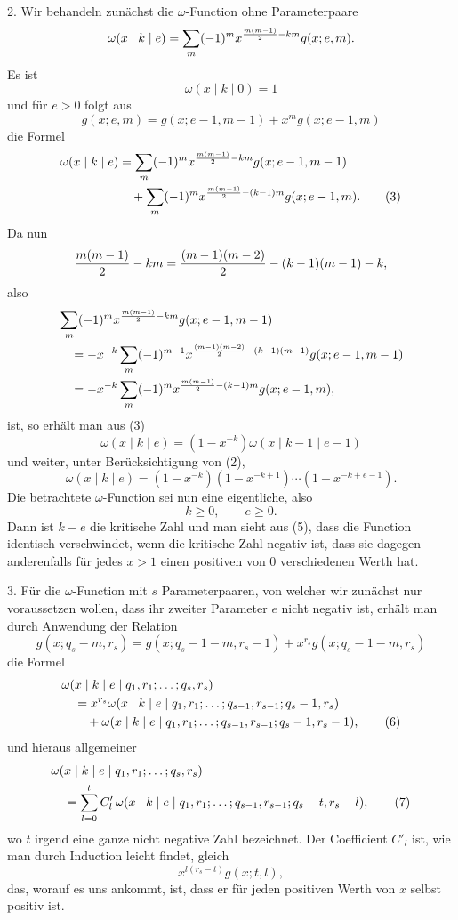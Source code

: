 2. Wir behandeln zunächst die $\omega$-Function ohne Parameterpaare
\[
 \omega(x\mid k\mid e)=\sum_m(-1)^m x^{{m(m-1)\over2}-km}g(x;e,m).
\]
Es ist
\begin{equation}
 \omega(x\mid k\mid0)=1
\tag{2}
\end{equation}
und für $e>0$ folgt aus
\[
 g(x;e,m)=g(x;e-1,m-1)+x^m g(x;e-1,m)
\]
die Formel
\begin{align}
\omega(x\mid k\mid e)
&=\sum_m(-1)^m x^{{m(m-1)\over2}-km}g(x;e-1,m-1)\notag\\
&\quad+\sum_m(-1)^m x^{{m(m-1)\over2}-(k-1)m}g(x;e-1,m).
\tag{3}
\end{align}
Da nun
\[
 {m(m-1)\over2}-km={(m-1)(m-2)\over2}-(k-1)(m-1)-k,
\]
also
\begin{align*}
&\sum_m(-1)^m x^{{m(m-1)\over2}-km}g(x;e-1,m-1)\\
&\quad=-x^{-k}\sum_m(-1)^{m-1}x^{{(m-1)(m-2)\over2}-(k-1)(m-1)}g(x;e-1,m-1)\\
&\quad=-x^{-k}\sum_m(-1)^m x^{{m(m-1)\over2}-(k-1)m}g(x;e-1,m),
\end{align*}
ist, so erhält man aus (3)
\begin{equation}
 \omega(x\mid k\mid e)=(1-x^{-k})\omega(x\mid k-1\mid e-1)
\tag{4}
\end{equation}
und weiter, unter Berücksichtigung von (2),
\begin{equation}
 \omega(x\mid k\mid e)=(1-x^{-k})(1-x^{-k+1})\cdots(1-x^{-k+e-1}).
\tag{5}
\end{equation}
Die betrachtete $\omega$-Function sei nun eine eigentliche, also
\[
 k\ge0,
 \qquad e\ge0.
\]
Dann ist $k-e$ die kritische Zahl und man sieht aus (5), dass die Function identisch verschwindet, wenn die kritische Zahl negativ ist, dass sie dagegen anderenfalls für jedes $x>1$ einen positiven von 0 verschiedenen Werth hat.

3. Für die $\omega$-Function mit $s$ Parameterpaaren, von welcher wir zunächst nur voraussetzen wollen, dass ihr zweiter Parameter $e$ nicht negativ ist, erhält man durch Anwendung der Relation
\[
 g(x;q_s-m,r_s)=g(x;q_s-1-m,r_s-1)+x^{r_s}g(x;q_s-1-m,r_s)
\]
die Formel
\begin{align}
&\omega(x\mid k\mid e\mid q_1,r_1;\ldots;q_s,r_s)\notag\\
&\quad=x^{r_s}\omega(x\mid k\mid e\mid q_1,r_1;\ldots;q_{s-1},r_{s-1};q_s-1,r_s)\notag\\
&\qquad+\omega(x\mid k\mid e\mid q_1,r_1;\ldots;q_{s-1},r_{s-1};q_s-1,r_s-1),
\tag{6}
\end{align}
und hieraus allgemeiner
\begin{align}
&\omega(x\mid k\mid e\mid q_1,r_1;\ldots;q_s,r_s)\notag\\
&\quad=\sum_{l=0}^t C'_l\,
 \omega(x\mid k\mid e\mid q_1,r_1;\ldots;q_{s-1},r_{s-1};q_s-t,r_s-l),
\tag{7}
\end{align}
wo $t$ irgend eine ganze nicht negative Zahl bezeichnet. Der Coefficient $C'_l$ ist, wie man durch Induction leicht findet, gleich
\[
 x^{l(r_s-t)}g(x;t,l),
\]
das, worauf es uns ankommt, ist, dass er für jeden positiven Werth von $x$ selbst positiv ist.

